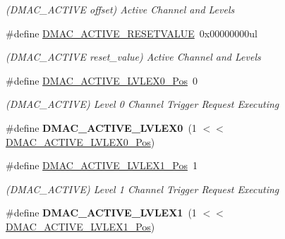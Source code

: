 \begin{DoxyCompactItemize}
\begin{DoxyCompactList}\small\item\em (D\+M\+A\+C\+\_\+\+A\+C\+T\+I\+V\+E offset) Active Channel and Levels \end{DoxyCompactList}\item 
\hypertarget{group___s_a_m_l21___d_m_a_c_gafe8aed5d737179d2eadb6bf00646f19f}{}\#define \hyperlink{group___s_a_m_l21___d_m_a_c_gafe8aed5d737179d2eadb6bf00646f19f}{D\+M\+A\+C\+\_\+\+A\+C\+T\+I\+V\+E\+\_\+\+R\+E\+S\+E\+T\+V\+A\+L\+U\+E}~0x00000000ul\label{group___s_a_m_l21___d_m_a_c_gafe8aed5d737179d2eadb6bf00646f19f}

\begin{DoxyCompactList}\small\item\em (D\+M\+A\+C\+\_\+\+A\+C\+T\+I\+V\+E reset\+\_\+value) Active Channel and Levels \end{DoxyCompactList}\item 
\hypertarget{group___s_a_m_l21___d_m_a_c_ga512df6502dddde8c29c8154e57a5d4b8}{}\#define \hyperlink{group___s_a_m_l21___d_m_a_c_ga512df6502dddde8c29c8154e57a5d4b8}{D\+M\+A\+C\+\_\+\+A\+C\+T\+I\+V\+E\+\_\+\+L\+V\+L\+E\+X0\+\_\+\+Pos}~0\label{group___s_a_m_l21___d_m_a_c_ga512df6502dddde8c29c8154e57a5d4b8}

\begin{DoxyCompactList}\small\item\em (D\+M\+A\+C\+\_\+\+A\+C\+T\+I\+V\+E) Level 0 Channel Trigger Request Executing \end{DoxyCompactList}\item 
\hypertarget{group___s_a_m_l21___d_m_a_c_gad5f14dee19d818e90a36ae4e2f21b5c3}{}\#define {\bfseries D\+M\+A\+C\+\_\+\+A\+C\+T\+I\+V\+E\+\_\+\+L\+V\+L\+E\+X0}~(1 $<$$<$ \hyperlink{group___s_a_m_l21___d_m_a_c_ga512df6502dddde8c29c8154e57a5d4b8}{D\+M\+A\+C\+\_\+\+A\+C\+T\+I\+V\+E\+\_\+\+L\+V\+L\+E\+X0\+\_\+\+Pos})\label{group___s_a_m_l21___d_m_a_c_gad5f14dee19d818e90a36ae4e2f21b5c3}

\item 
\hypertarget{group___s_a_m_l21___d_m_a_c_ga1afc3d2455776ef792e84b52f296256c}{}\#define \hyperlink{group___s_a_m_l21___d_m_a_c_ga1afc3d2455776ef792e84b52f296256c}{D\+M\+A\+C\+\_\+\+A\+C\+T\+I\+V\+E\+\_\+\+L\+V\+L\+E\+X1\+\_\+\+Pos}~1\label{group___s_a_m_l21___d_m_a_c_ga1afc3d2455776ef792e84b52f296256c}

\begin{DoxyCompactList}\small\item\em (D\+M\+A\+C\+\_\+\+A\+C\+T\+I\+V\+E) Level 1 Channel Trigger Request Executing \end{DoxyCompactList}\item 
\hypertarget{group___s_a_m_l21___d_m_a_c_ga3a25b90f98a7d2d805729ed3ee6c35af}{}\#define {\bfseries D\+M\+A\+C\+\_\+\+A\+C\+T\+I\+V\+E\+\_\+\+L\+V\+L\+E\+X1}~(1 $<$$<$ \hyperlink{group___s_a_m_l21___d_m_a_c_ga1afc3d2455776ef792e84b52f296256c}{D\+M\+A\+C\+\_\+\+A\+C\+T\+I\+V\+E\+\_\+\+L\+V\+L\+E\+X1\+\_\+\+Pos})\label{group___s_a_m_l21___d_m_a_c_ga3a25b90f98a7d2d805729ed3ee6c35af}


\end{DoxyCompactItemize}
